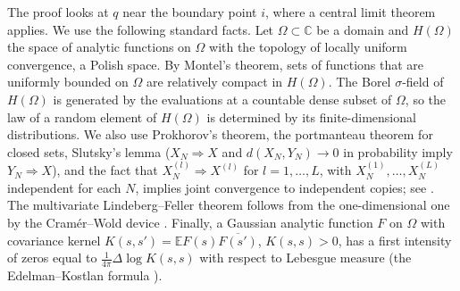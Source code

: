 \documentclass[11pt]{amsart}
\theoremstyle{definition}
\theoremstyle{remark}
\numberwithin{equation}{section}
\newcommand{\C}{\mathbb{C}}
\newcommand{\E}{\mathbb{E}}
\begin{document}
The proof looks at $q$ near the boundary point $i$, where a central limit theorem applies. We use the following standard facts. Let $\Omega\subset\C$ be a domain and $H(\Omega)$ the space of analytic functions on $\Omega$ with the topology of locally uniform convergence, a Polish space. By Montel's theorem, sets of functions that are uniformly bounded on $\Omega$ are relatively compact in $H(\Omega)$. The Borel $\sigma$-field of $H(\Omega)$ is generated by the evaluations at a countable dense subset of $\Omega$, so the law of a random element of $H(\Omega)$ is determined by its finite-dimensional distributions. We also use Prokhorov's theorem, the portmanteau theorem for closed sets, Slutsky's lemma ($X_N\Rightarrow X$ and $d(X_N,Y_N)\to0$ in probability imply $Y_N\Rightarrow X$), and the fact that $X_N^{(l)}\Rightarrow X^{(l)}$ for $l=1,\dots,L$, with $X_N^{(1)},\dots,X_N^{(L)}$ independent for each $N$, implies joint convergence to independent copies; see \cite[Chapter~1]{Bi2}. The multivariate Lindeberg--Feller theorem follows from the one-dimensional one by the Cram\'er--Wold device \cite[Theorems~27.2 and~29.4]{Bi}. Finally, a Gaussian analytic function $F$ on $\Omega$ with covariance kernel $K(s,s')=\E F(s)\overline{F(s')}$, $K(s,s)>0$, has a first intensity of zeros equal to $\frac1{4\pi}\Delta\log K(s,s)$ with respect to Lebesgue measure (the Edelman--Kostlan formula \cite[Section~2.4]{HKPV}).
\end{document}

